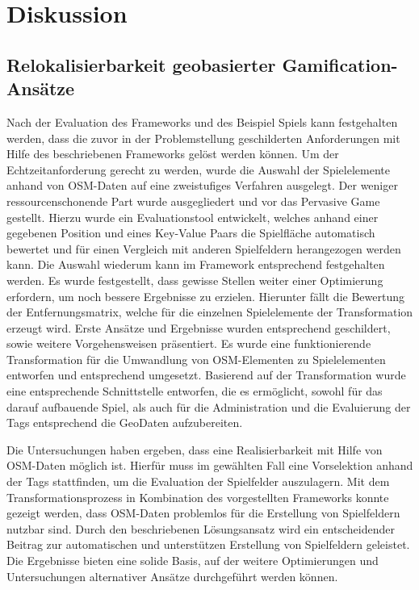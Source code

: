 \chapter{Diskussion}
\label{sec:S7_Diskussion}

\section{Relokalisierbarkeit geobasierter Gamification-Ansätze}

Nach der Evaluation des Frameworks und des Beispiel Spiels kann festgehalten werden, dass die zuvor in der Problemstellung geschilderten Anforderungen mit Hilfe des beschriebenen Frameworks gelöst werden können. Um der Echtzeitanforderung gerecht zu werden, wurde die Auswahl der Spielelemente anhand von OSM-Daten auf eine zweistufiges Verfahren ausgelegt. Der weniger ressourcenschonende Part wurde ausgegliedert und vor das Pervasive Game gestellt. Hierzu wurde ein Evaluationstool entwickelt, welches anhand einer gegebenen Position und eines Key-Value Paars die Spielfläche automatisch bewertet und für einen Vergleich mit anderen Spielfeldern herangezogen werden kann.
Die Auswahl wiederum kann im Framework entsprechend festgehalten werden. Es wurde festgestellt, dass gewisse Stellen weiter einer Optimierung erfordern, um noch bessere Ergebnisse zu erzielen.
Hierunter fällt die Bewertung der Entfernungsmatrix, welche für die einzelnen Spielelemente der Transformation erzeugt wird. Erste Ansätze und Ergebnisse wurden entsprechend geschildert, sowie weitere Vorgehensweisen präsentiert.
Es wurde eine funktionierende Transformation für die Umwandlung von OSM-Elementen zu Spielelementen entworfen und entsprechend umgesetzt.
Basierend auf der Transformation wurde eine entsprechende Schnittstelle entworfen, die es ermöglicht, sowohl für das darauf aufbauende Spiel, als auch für die Administration und die Evaluierung der Tags entsprechend die GeoDaten aufzubereiten.

Die Untersuchungen haben ergeben, dass eine Realisierbarkeit mit Hilfe von OSM-Daten möglich ist. Hierfür muss im gewählten Fall eine Vorselektion anhand der Tags stattfinden, um die Evaluation der Spielfelder auszulagern. Mit dem Transformationsprozess in Kombination des vorgestellten Frameworks konnte gezeigt werden, dass OSM-Daten problemlos für die Erstellung von Spielfeldern nutzbar sind. Durch den beschriebenen Lösungsansatz wird ein entscheidender Beitrag zur automatischen und unterstützen Erstellung von Spielfeldern geleistet. Die Ergebnisse bieten eine solide Basis, auf der weitere Optimierungen  und Untersuchungen alternativer Ansätze durchgeführt werden können.


